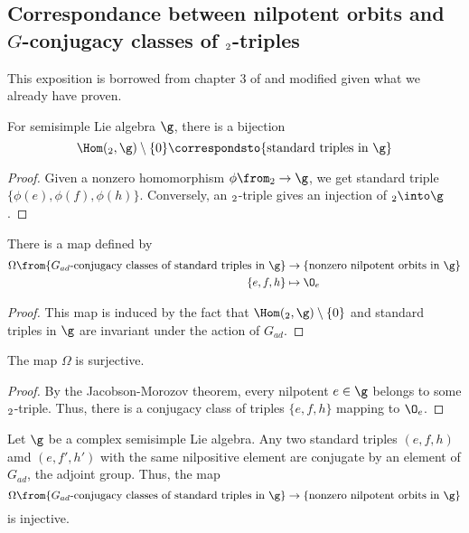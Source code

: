 \documentclass[springer-theory-notes.tex]{subfiles}
\begin{document}
\subsection{Correspondance between nilpotent orbits and
  \(G\)-conjugacy classes of \(\sl_2\)-triples}
This exposition is borrowed from chapter 3 of \cite{cm} and modified
given what we already have proven.
\begin{prop}
  For semisimple Lie algebra \(\g\), there is a bijection \[
    \Hom(\sl_2,\g) \setminus \{0\} \correspondsto \{\text{standard
      triples in }\g\}
  \]
\end{prop}
\begin{proof}
  Given a nonzero homomorphism \(\phi \from \sl_2 \to \g\), we get
  standard triple \(\{\phi(e), \phi(f), \phi(h)\}\). Conversely, an
  \(\sl_2\)-triple gives an injection of \(\sl_2 \into \g\).
\end{proof}
\begin{prop}
  There is a map defined by
  \begin{align*}
    \Omega \from \{G_{ad}\text{-conjugacy classes of standard triples
    in }\g\} & \to \{\text{nonzero nilpotent orbits in }\g\}\\
    \{e,f,h\} & \mapsto \O_e
  \end{align*}
\end{prop}
\begin{proof}
  This map is induced by the fact that \(\Hom(\sl_2,\g) \setminus
  \{0\}\) and standard triples in \(\g\) are invariant under the
  action of \(G_{ad}\).
\end{proof}
\begin{prop}
  The map \(\Omega\) is surjective.
\end{prop}
\begin{proof}
  By the Jacobson-Morozov theorem, every nilpotent \(e \in \g\)
  belongs to some \(\sl_2\)-triple. Thus, there is a conjugacy class
  of triples \(\{e,f,h\}\) mapping to \(\O_e\).
\end{proof}
\begin{prop}
  Let \(\g\) be a complex semisimple Lie algebra. Any two standard
  triples \((e,f,h)\) amd \((e,f',h')\) with the same nilpositive
  element are conjugate by an element of \(G_{ad}\), the adjoint
  group. Thus, the map \[
    \Omega \from \{G_{ad}\text{-conjugacy classes of standard triples
      in }\g\} \to \{\text{nonzero nilpotent orbits in }\g\}
  \]
  is injective.
\end{prop}
\begin{rmk}
  
\end{rmk}
\end{document}

